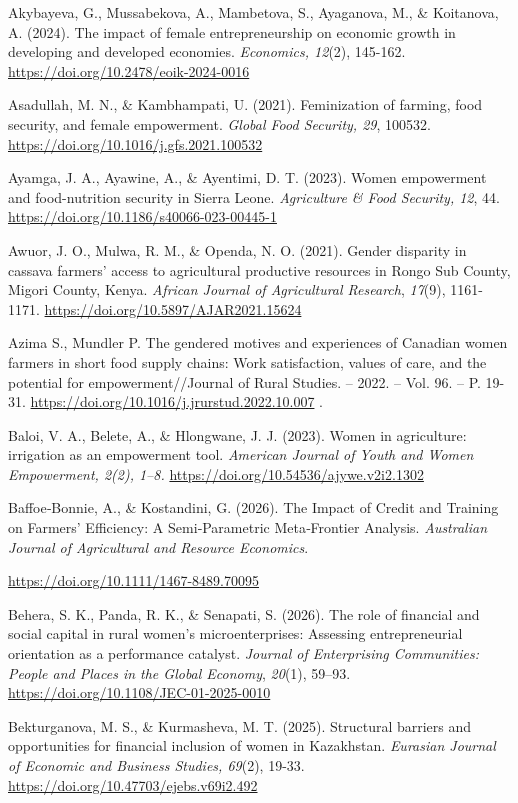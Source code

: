 \documentclass[
]{article}
\begin{document}
Akybayeva, G., Mussabekova, A., Mambetova, S., Ayaganova, M., \&
Koitanova, A. (2024). The impact of female entrepreneurship on economic
growth in developing and developed economies. \emph{Economics, 12}(2),
145-162. \url{https://doi.org/10.2478/eoik-2024-0016}

Asadullah, M. N., \& Kambhampati, U. (2021). Feminization of farming,
food security, and female empowerment. \emph{Global Food Security, 29},
100532. \url{https://doi.org/10.1016/j.gfs.2021.100532}

Ayamga, J. A., Ayawine, A., \& Ayentimi, D. T. (2023). Women empowerment
and food-nutrition security in Sierra Leone. \emph{Agriculture \& Food
Security, 12}, 44. \url{https://doi.org/10.1186/s40066-023-00445-1}

Awuor, J. O., Mulwa, R. M., \& Openda, N. O. (2021). Gender disparity in
cassava farmers' access to agricultural productive resources in Rongo
Sub County, Migori County, Kenya. \emph{African Journal of Agricultural
Research}, \emph{17}(9), 1161-1171.
\url{https://doi.org/10.5897/AJAR2021.15624}

Azima S., Mundler P. The gendered motives and experiences of Canadian
women farmers in short food supply chains: Work satisfaction, values of
care, and the potential for empowerment//Journal of Rural Studies. --
2022. -- Vol. 96. -- P. 19-31.
\url{https://doi.org/10.1016/j.jrurstud.2022.10.007} .

Baloi, V. A., Belete, A., \& Hlongwane, J. J. (2023). Women in
agriculture: irrigation as an empowerment tool. \emph{American Journal
of Youth and Women Empowerment, 2(2), 1--8.}
\url{https://doi.org/10.54536/ajywe.v2i2.1302}

Baffoe‐Bonnie, A., \& Kostandini, G. (2026). The Impact of Credit and
Training on Farmers' Efficiency: A Semi‐Parametric Meta‐Frontier
Analysis. \emph{Australian Journal of Agricultural and Resource
Economics}.

\url{https://doi.org/10.1111/1467-8489.70095}

Behera, S. K., Panda, R. K., \& Senapati, S. (2026). The role of
financial and social capital in rural women's microenterprises:
Assessing entrepreneurial orientation as a performance catalyst.
\emph{Journal of Enterprising Communities: People and Places in the
Global Economy}, \emph{20}(1), 59--93.
\url{https://doi.org/10.1108/JEC-01-2025-0010}

Bekturganova, M. S., \& Kurmasheva, M. T. (2025). Structural barriers
and opportunities for financial inclusion of women in Kazakhstan.
\emph{Eurasian Journal of Economic and Business Studies, 69}(2), 19-33.
\url{https://doi.org/10.47703/ejebs.v69i2.492}
\end{document}
